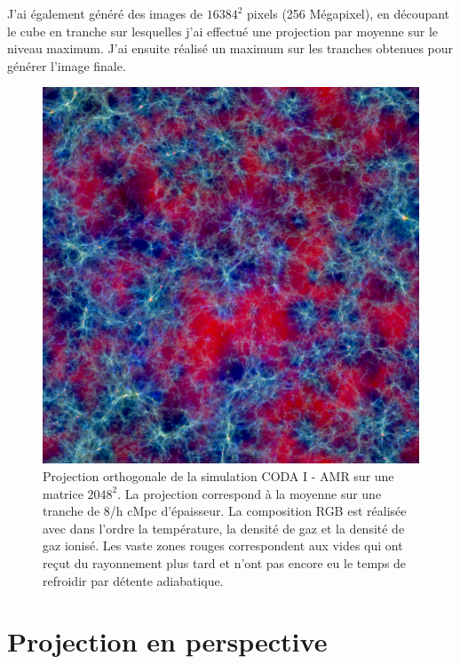 J'ai également généré des images de $16384^2$ pixels (256 Mégapixel), en découpant le cube en tranche sur lesquelles j'ai effectué une projection par moyenne sur le niveau maximum.
J'ai ensuite réalisé un maximum sur les tranches obtenues pour générer l'image finale.



\begin{figure}
        \includegraphics[width=.95\textwidth]{img/04/rgb-compose.jpeg} 
        \caption[Projection orthogonale]{Projection orthogonale de la simulation CODA I - AMR sur une matrice $2048^2$.
        La projection correspond à la moyenne sur une tranche de 8/h cMpc d'épaisseur. 
        La composition RGB est réalisée avec dans l'ordre la température, la densité de gaz et la densité de gaz ionisé.
		Les vaste zones rouges correspondent aux vides qui ont reçut du rayonnement plus tard et n'ont pas encore eu le temps de refroidir par détente adiabatique.  
        }
 		\label{fig:ortho}
\end{figure}


\clearpage
\section{Projection en perspective}


